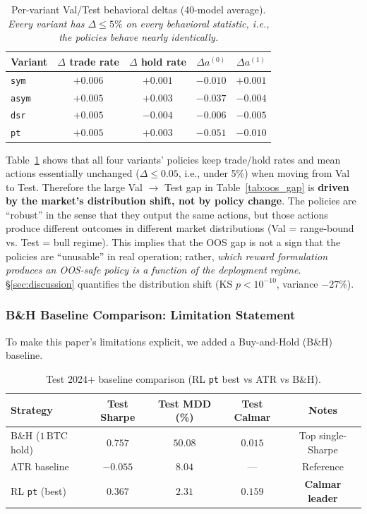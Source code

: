 \documentclass[11pt, a4paper]{article}
\begin{document}
\begin{table}[!htbp]
\centering
\caption{Per-variant Val/Test behavioral deltas (40-model average).
\textit{Every variant has $\Delta \leq 5\%$ on every behavioral statistic,
i.e., the policies behave nearly identically.}}
\begin{tabular}{lcccc}
\toprule
Variant & $\Delta$ trade rate & $\Delta$ hold rate & $\Delta a^{(0)}$ & $\Delta a^{(1)}$ \\
\midrule
\texttt{sym}  & $+0.006$ & $+0.001$ & $-0.010$ & $+0.001$ \\
\texttt{asym} & $+0.005$ & $+0.003$ & $-0.037$ & $-0.004$ \\
\texttt{dsr}  & $+0.005$ & $-0.004$ & $-0.006$ & $-0.005$ \\
\texttt{pt}   & $+0.005$ & $+0.003$ & $-0.051$ & $-0.010$ \\
\bottomrule
\end{tabular}
\label{tab:val_test_stability}
\end{table}

Table~\ref{tab:val_test_stability} shows that all four variants' policies
keep trade/hold rates and mean actions essentially unchanged ($\Delta \leq
0.05$, i.e., under 5\%) when moving from Val to Test. Therefore the large
Val $\to$ Test gap in Table~\ref{tab:oos_gap} is \textbf{driven by the
market's distribution shift, not by policy change}. The policies are
``robust'' in the sense that they output the same actions, but those actions
produce different outcomes in different market distributions
(Val = range-bound vs. Test = bull regime). This implies that the OOS gap
is not a sign that the policies are ``unusable'' in real operation; rather,
\emph{which reward formulation produces an OOS-safe policy is a function of
the deployment regime}. \S\ref{sec:discussion} quantifies the distribution
shift (KS $p < 10^{-10}$, variance $-27\%$).

\subsubsection{B\&H Baseline Comparison: Limitation Statement}
\label{sec:oos_bh_honesty}

To make this paper's limitations explicit, we added a Buy-and-Hold (B\&H)
baseline.

\begin{table}[!htbp]
\centering
\caption{Test 2024+ baseline comparison (RL \texttt{pt} best vs ATR vs B\&H).}
\begin{tabular}{lcccc}
\toprule
Strategy & Test Sharpe & Test MDD (\%) & Test Calmar & Notes \\
\midrule
B\&H ($1\,\mathrm{BTC}$ hold) & $\mathbf{0.757}$ & $50.08$ & $0.015$ & Top single-Sharpe \\
ATR baseline & $-0.055$ & $8.04$ & --- & Reference \\
RL \texttt{pt} (best) & $0.367$ & $2.31$ & $\mathbf{0.159}$ & \textbf{Calmar leader} \\
\bottomrule
\end{tabular}
\label{tab:bh_comparison}
\end{table}
\end{document}
